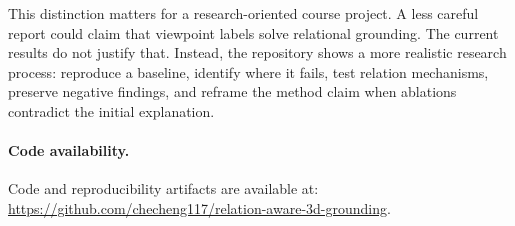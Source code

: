 This distinction matters for a research-oriented course project. A less careful report could claim that viewpoint labels solve relational grounding. The current results do not justify that. Instead, the repository shows a more realistic research process: reproduce a baseline, identify where it fails, test relation mechanisms, preserve negative findings, and reframe the method claim when ablations contradict the initial explanation.

\paragraph{Code availability.}
Code and reproducibility artifacts are available at:\\
\url{https://github.com/checheng117/relation-aware-3d-grounding}.
